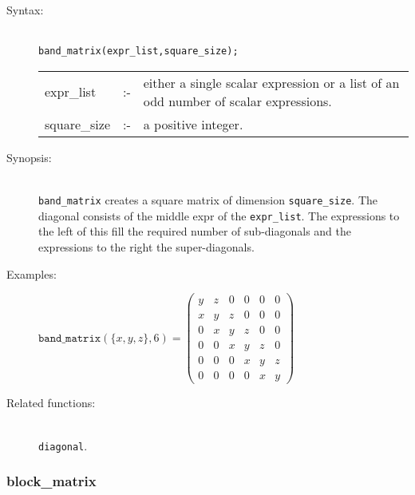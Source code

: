 \begin{description}
\item[Syntax:]\mbox{}\\
\texttt{band\_matrix(expr\_list,square\_size);}\\[2mm]
\begin{tabular}{l l p{.72\linewidth}}
expr\_list  &:-& 
either a single scalar expression or a list of an odd number of scalar
expressions. \\
square\_size &:-& a positive integer.
\end{tabular}


\item[Synopsis:]\mbox{}\\
                \texttt{band\_matrix} creates a square matrix of
                dimension \texttt{square\_size}. The diagonal consists of the
                middle expr of the \texttt{expr\_list}. The expressions to the
                left of this fill the required number of sub-diagonals and the
                expressions to the right the super-diagonals.

\item[Examples:]
\begin{flushleft}  
\begin{math}  
\texttt{band\_matrix}(\{x,y,z\},6) = 
 \begin{pmatrix} y & z & 0 & 0 & 0 & 0 \\
                 x & y & z & 0 & 0 & 0 \\ 
                 0 & x & y & z & 0 & 0 \\
                 0 & 0 & x & y & z & 0 \\
                 0 & 0 & 0 & x & y & z \\
                 0 & 0 & 0 & 0 & x & y 
 \end{pmatrix}
\end{math}  
\end{flushleft}

\item[Related functions:]\mbox{}\\
 \texttt{diagonal}.
\end{description}


\subsubsection{block\_matrix}
\label{linalg:block_matrix}

